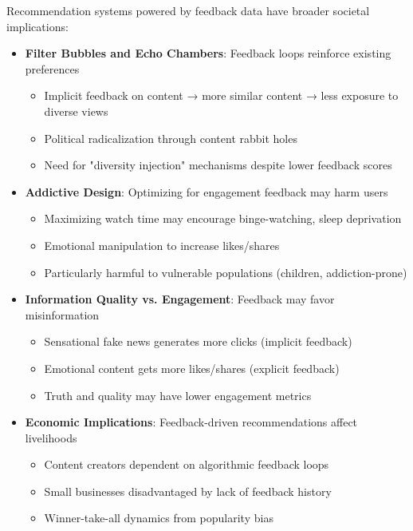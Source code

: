 Recommendation systems powered by feedback data have broader societal implications:

\begin{itemize}
    \item \textbf{Filter Bubbles and Echo Chambers}: Feedback loops reinforce existing preferences
    \begin{itemize}
        \item Implicit feedback on content → more similar content → less exposure to diverse views
        \item Political radicalization through content rabbit holes
        \item Need for "diversity injection" mechanisms despite lower feedback scores
    \end{itemize}
    
    \item \textbf{Addictive Design}: Optimizing for engagement feedback may harm users
    \begin{itemize}
        \item Maximizing watch time may encourage binge-watching, sleep deprivation
        \item Emotional manipulation to increase likes/shares
        \item Particularly harmful to vulnerable populations (children, addiction-prone)
    \end{itemize}
    
    \item \textbf{Information Quality vs. Engagement}: Feedback may favor misinformation
    \begin{itemize}
        \item Sensational fake news generates more clicks (implicit feedback)
        \item Emotional content gets more likes/shares (explicit feedback)
        \item Truth and quality may have lower engagement metrics
    \end{itemize}
    
    \item \textbf{Economic Implications}: Feedback-driven recommendations affect livelihoods
    \begin{itemize}
        \item Content creators dependent on algorithmic feedback loops
        \item Small businesses disadvantaged by lack of feedback history
        \item Winner-take-all dynamics from popularity bias
    \end{itemize}
\end{itemize}

